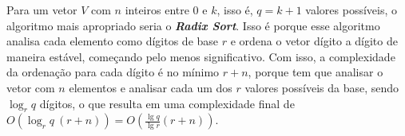 Para um vetor $V$ com $n$ inteiros entre $0$ e $k$, isso é, $q=k+1$ valores possíveis, o algoritmo mais apropriado seria o \textbf{\textit{Radix Sort}}.
Isso é porque esse algoritmo analisa cada elemento como dígitos de base $r$ e ordena o vetor dígito a dígito de maneira estável,
começando pelo menos significativo. Com isso, a complexidade da ordenação para cada dígito é no mínimo $r+n$, porque
tem que analisar o vetor com $n$ elementos e analisar cada um dos $r$ valores possíveis da base, sendo $\log_r q$ dígitos,
o que resulta em uma complexidade final de $O(\log_r q\ (r+n)) = O\left(\frac{\lg q}{\lg r} (r+n)\right)$.